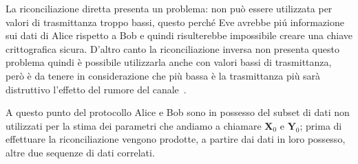 La riconciliazione diretta presenta un problema: non pu\`o essere utilizzata per valori di trasmittanza troppo bassi, questo perch\'e Eve avrebbe pi\'u informazione sui dati di Alice rispetto a Bob e quindi risulterebbe impossibile creare una chiave crittografica sicura. D'altro canto la riconciliazione inversa non presenta questo problema quindi \`e possibile utilizzarla anche con valori bassi di trasmittanza, per\`o \`e da tenere in considerazione che pi\`u bassa \`e la trasmittanza pi\`u sar\`a distruttivo l'effetto del rumore del canale~\cite{https://doi.org/10.1002/qute.201800011}.


A questo punto del protocollo Alice e Bob sono in possesso del subset di dati non utilizzati per la stima dei parametri che andiamo a chiamare $\textbf{X}_0$ e $\textbf{Y}_0$; prima di effettuare la riconciliazione vengono prodotte, a partire dai dati in loro possesso, altre due sequenze di dati correlati. 

